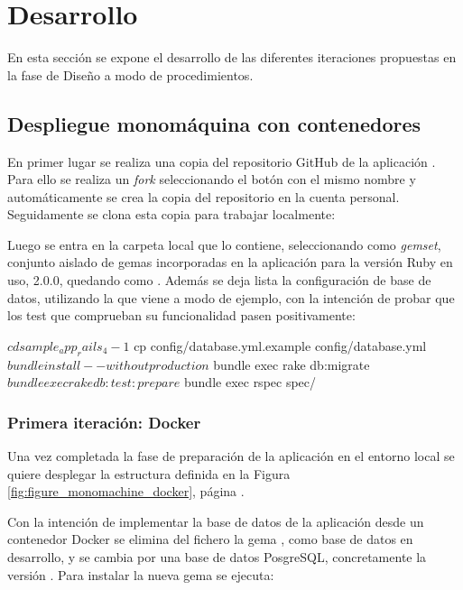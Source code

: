 \chapter{Desarrollo}
\label{cha:regulation}

En esta sección se expone el desarrollo de las diferentes iteraciones propuestas en la fase de Diseño a modo de procedimientos.

\section{Despliegue monomáquina con contenedores}

En primer lugar se realiza una copia del repositorio GitHub de la aplicación . Para ello se realiza un \textit{fork} seleccionando el botón con el mismo nombre y automáticamente se crea la copia del repositorio en la cuenta personal. Seguidamente se clona esta copia para trabajar localmente:


Luego se entra en la carpeta local que lo contiene, seleccionando como \textit{gemset}, conjunto aislado de gemas incorporadas en la aplicación para la versión Ruby en uso, 2.0.0, quedando como . Además se deja lista la configuración de base de datos, utilizando la que viene a modo de ejemplo, con la intención de probar que los test que comprueban su funcionalidad pasen positivamente: 

\begin{code}
$ cd sample_app_rails_4-1
$ cp config/database.yml.example config/database.yml
$ bundle install --without production
$ bundle exec rake db:migrate
$ bundle exec rake db:test:prepare
$ bundle exec rspec spec/
\end{code}

\subsection{Primera iteración: Docker}

Una vez completada la fase de preparación de la aplicación en el entorno local se quiere desplegar la estructura definida en la Figura \ref{fig:figure_monomachine_docker}, página \pageref{fig:figure_monomachine_docker}.

Con la intención de implementar la base de datos de la aplicación desde un contenedor Docker se elimina del fichero  la gema , como base de datos en desarrollo, y se cambia por una base de datos PosgreSQL, concretamente la versión . Para instalar la nueva gema se ejecuta:

